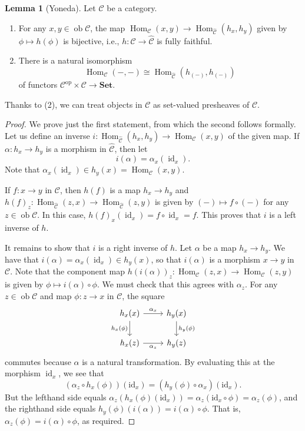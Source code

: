 \documentclass[10pt,letterpaper,cm]{nupset}
\theoremstyle{definition}
\theoremstyle{theorem}
\newtheorem{lemma}[definition]{Lemma}
\theoremstyle{remark}
\newcommand{\1}{\mathbf{1}}
\renewcommand{\c}{\mathscr{C}}
\newcommand{\0}{\vec 0}
\DeclareMathOperator{\id}{\mathrm{id}}
\DeclareMathOperator{\op}{op}
\DeclareMathOperator{\ob}{ob}
\DeclareMathOperator{\Hom}{Hom}
\begin{document}
\begin{lemma}[Yoneda] Let $\c$ be a category.
\begin{enumerate}[label=(\arabic*)]
\item For any $x, y \in \ob \c$, the map $\Hom_{\c}(x, y) \to \Hom_{\widehat{\c}}(h_x, h_y)$ given by $\phi \mapsto h(\phi)$ is bijective, i.e., $h : \c \to \widehat{\c}$ is fully faithful.
\item There is a natural isomorphism $$\Hom_{\c}(-, -) \cong \Hom_{\widehat{\c}}\left(h_{(-)}, h_{(-)}\right)$$ of functors $ \c^{\op} \times \c \to \mathbf{Set}$.
\end{enumerate}
\end{lemma}
Thanks to (2), we can treat objects in $\c$ as set-valued presheaves of $\c$.
\begin{proof}
We prove just the first statement, from which the second follows formally.
Let us define an inverse $i:  \Hom_{\widehat{\c}}(h_x, h_y) \to \Hom_{\c}(x, y)$ of the given map. If $\alpha : h_x \to h_y$ is a morphism in $\widehat{\c}$, then let $$i(\alpha) = \alpha_x(\id_x).$$ Note that $\alpha_x(\id_x) \in h_y(x) = \Hom_{\c}(x,y)$.

\medskip

 If $f: x \to y$ in $\c$, then $h(f)$ is a map $h_x \to h_y$ and $h(f)_z : \Hom_{\widehat{\c}}(z, x) \to \Hom_{\widehat{\c}}(z, y)$ is given by $\left({-}\right) \mapsto f \circ (-)$ for any $z\in \ob \c$. In this case, $h(f)_x(\id_x) = f\circ \id_x = f$. This proves that $i$ is a left inverse of $h$.

\medskip

 It remains to show that $i$ is a right inverse of $h$. Let $\alpha$ be a map $h_x \to h_y$.  We have that $
i(\alpha) = \alpha_x(\id_x) \in h_y(x)$, so that $i(\alpha)$ is a morphism $x \to y$ in $\c$. Note that the component map $h(i(\alpha))_z : \Hom_{\c}(z, x) \to \Hom_{\c}(z, y)$ is given by $\phi \mapsto i(\alpha) \circ \phi.$ We must check that this agrees with $\alpha_z$. For any $z \in \ob \c$ and map $\phi : z \to x$ in $\c$, the square
\[
\begin{tikzcd}
h_x(x) \arrow[r, "\alpha_x"] \arrow[d, "h_x(\phi)"'] & h_y(x) \arrow[d, "h_y(\phi)"] \\
h_x(z) \arrow[r, "\alpha_z"'] & h_y(z)
\end{tikzcd}
\] commutes
because $\alpha$ is a natural transformation. By evaluating this at the morphism $\id_x$, we see that 
\[
\left(\alpha_{z} \circ h_{x}(\phi)\right)\left(\mathrm{id}_{x}\right)=\left(h_{y}(\phi) \circ \alpha_{x}\right)\left(\mathrm{id}_{x}\right)
.\] But the lefthand side equals $\alpha_{z}\left(h_{x}(\phi)\left(\mathrm{id}_{x}\right)\right)=\alpha_{z}\left(\mathrm{id}_{x} \circ \phi\right) = \alpha_z(\phi)$, and the righthand side equals $h_y(\phi)(i(\alpha)) = i(\alpha) \circ \phi$.
That is, $\alpha_z(\phi) = i(\alpha) \circ \phi$, as required.
\end{proof}
\end{document}
